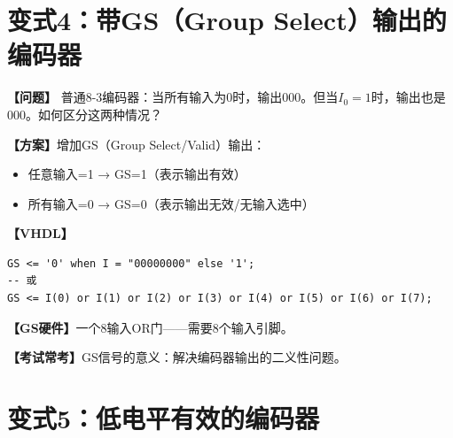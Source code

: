 \section{变式4：带GS（Group Select）输出的编码器}

\begin{detailbox}[完整教学]

\textbf{【问题】}
普通8-3编码器：当所有输入为0时，输出000。但当$I_0=1$时，输出也是000。如何区分这两种情况？

\textbf{【方案】}增加GS（Group Select/Valid）输出：
\begin{itemize}
  \item 任意输入=1 → GS=1（表示输出有效）
  \item 所有输入=0 → GS=0（表示输出无效/无输入选中）
\end{itemize}

\textbf{【VHDL】}
\begin{lstlisting}
GS <= '0' when I = "00000000" else '1';
-- 或
GS <= I(0) or I(1) or I(2) or I(3) or I(4) or I(5) or I(6) or I(7);
\end{lstlisting}

\textbf{【GS硬件】}一个8输入OR门——需要8个输入引脚。

\textbf{【考试常考】}GS信号的意义：解决编码器输出的二义性问题。

\end{detailbox}


\section{变式5：低电平有效的编码器}

